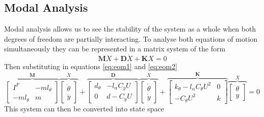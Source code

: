 \documentclass[11pt]{article}
\begin{document}
\subsection*{Modal Analysis}\label{sec:modal_analysis}
Modal analysis allows us to see the stability of the system as a whole when both degrees of freedom are partially interacting.
To analyse both equations of motion simultaneously they can be represented in a matrix system of the form
$$
  \mathbf{M}\ddot{X}+\mathbf{D}\dot{X}+\mathbf{K}X = 0
$$
Then substituting in equations \ref{eq:eom1} and \ref{eq:eom2}
$$
  \overbrace{
    \begin{bmatrix}
      I^F&-ml_{\theta} \\
      -ml_{\theta}&m
    \end{bmatrix}
  }^{\mathbf{M}}
  \overbrace{
    \begin{bmatrix}
      \ddot{\theta} \\
      \ddot{y}
    \end{bmatrix}
  }^{\ddot{X}}
  +
  \overbrace{
    \begin{bmatrix}
      d_{\theta}&-l_{\alpha}C_yU\\
      0&d-C_yU
    \end{bmatrix}
  }^{\mathbf{D}}
  \overbrace{
    \begin{bmatrix}
      \dot{\theta} \\
      \dot{y}
    \end{bmatrix}
  }^{\dot{X}}
  +
  \overbrace{
    \begin{bmatrix}
      k_{\theta}-l_{\alpha}C_{\theta}U^2&0\\
    -C_{\theta}U^2&k
    \end{bmatrix}
  }^{\mathbf{K}}
  \overbrace{
    \begin{bmatrix}
      \theta \\
      y
    \end{bmatrix}
  }^X
  = 0
$$
This system can then be converted into state space
\end{document}
